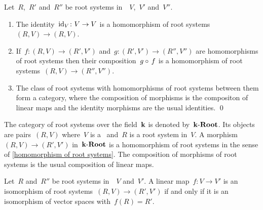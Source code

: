 

\begin{lemma}
  Let~$R$,~$R'$ and~$R''$ be root systems in~{\vectorspaces{$\kf$}}~$V$,~$V'$ and~$V''$.
  \begin{enumerate}
    \item
      The identity~$\operatorname{id}_V \colon V \to V$ is a homomorphism of root systems~$(R,V) \to (R,V)$.
    \item
      If~$f \colon (R,V) \to (R',V')$ and~$g \colon (R',V') \to (R'',V'')$ are homomorphisms of root systems then their composition~$g \circ {\,f}$ is a homomorphism of root systems~$(R, V) \to (R'', V'')$.
    \item
      The class of root systems with homomorphisms of root systems between them form a category, where the composition of morphisms is the compositon of linear maps and the identity morphisms are the usual identities.
    \qed
  \end{enumerate}
\end{lemma}


\begin{definition}
  The category of root systems over the field~$\kf$ is denoted by~$\mathbf{k}\text{-}\mathbf{Root}$.
  Its objects are pairs~$(R, V)$ where~$V$ is a~{\vectorspace{$\kf$}} and~$R$ is a root system in~$V$.
  A morphism~$(R, V) \to (R', V')$ in~$\mathbf{k}\text{-}\mathbf{Root}$ is a homomorphism of root systems in the sense of \cref{homomorphism of root systems}.
  The composition of morphisms of root systems is the usual composition of linear maps.
\end{definition}


\begin{lemma}
  \label{isomorphism of root systems on roots}
  Let~$R$ and~$R''$ be root systems in~{\vectorspaces{$\kf$}}~$V$ and~$V'$.
  A linear map~$f \colon V \to V'$ is an isomorphism of root systems~$(R, V) \to (R', V')$ if and only if it is an isomorphism of vector spaces with~$f(R) = R'$.
\end{lemma}


